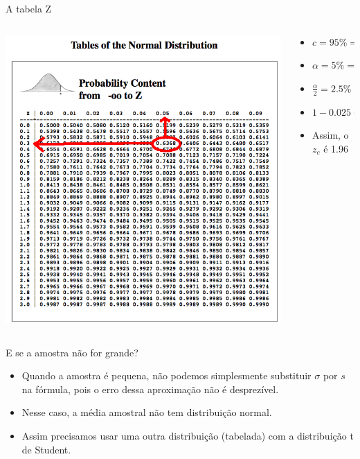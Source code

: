 \documentclass{beamer}
\begin{document}
\begin{frame}{A tabela Z}
  \begin{columns}
    \begin{column}{7cm}
    \includegraphics[height=0.9\textheight]{z_table}
    \end{column}
    \begin{column}{5cm}
      \begin{itemize}
      \item $c=95\% = 0.95$
      \item $\alpha = 5\% = 0.05$

      \item $\frac{\alpha}{2} = 2.5\% = 0.0250$

      \item $1-0.025 = 0.9750$%

      \item Assim, o $z_c$ é 1.96

      \end{itemize}
    \end{column}
  \end{columns}
\end{frame}

\begin{frame}{E se a amostra não for grande?}
  \begin{itemize}
  \item Quando a amostra é pequena, não podemos simplesmente
    substituir $\sigma$ por $s$ na fórmula, pois o erro dessa
    aproximação não é desprezível.
  \item Nesse caso, a média amostral não tem distribuição normal.
  \item Assim precisamos usar uma outra distribuição (tabelada) com a
    distribuição \alert{t de Student}.
  \end{itemize}
\end{frame}
\end{document}
